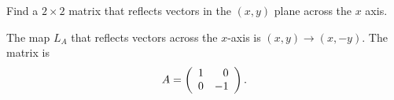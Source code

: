 \documentclass{ximera}
\begin{document}
\begin{exercise} \label{c4.2.2a}
Find a $2\times 2$ matrix that reflects vectors in the $(x,y)$ plane across
the $x$ axis.

\begin{solution}
\soln The map $L_A$ that reflects vectors across the $x$-axis is
$(x,y) \rightarrow (x,-y)$.  The matrix is
\[
A = \left(\begin{array}{rr} 1 & 0\\ 0 &-1\end{array}\right).
\]

\end{solution}
\end{exercise}
\end{document}
